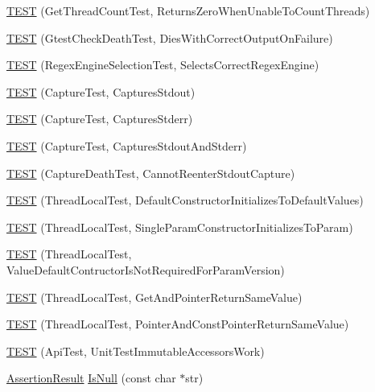 \begin{DoxyCompactItemize}
\item 
\hyperlink{namespacetesting_1_1internal_a5ad8299ae9325382f01b945f4f81711e}{T\+E\+ST} (Get\+Thread\+Count\+Test, Returns\+Zero\+When\+Unable\+To\+Count\+Threads)
\item 
\hyperlink{namespacetesting_1_1internal_afabff70df09a0e4fcda96dd36460c2b9}{T\+E\+ST} (Gtest\+Check\+Death\+Test, Dies\+With\+Correct\+Output\+On\+Failure)
\item 
\hyperlink{namespacetesting_1_1internal_a198f7132f76dd44d48dac54dc5d38fbb}{T\+E\+ST} (Regex\+Engine\+Selection\+Test, Selects\+Correct\+Regex\+Engine)
\item 
\hyperlink{namespacetesting_1_1internal_a0b658d88cea3a2fe6775b1b269c0204b}{T\+E\+ST} (Capture\+Test, Captures\+Stdout)
\item 
\hyperlink{namespacetesting_1_1internal_abbc9510a4f690912c32835213d95198f}{T\+E\+ST} (Capture\+Test, Captures\+Stderr)
\item 
\hyperlink{namespacetesting_1_1internal_a341ff65f3ca44b27fc51f03a9a05bee8}{T\+E\+ST} (Capture\+Test, Captures\+Stdout\+And\+Stderr)
\item 
\hyperlink{namespacetesting_1_1internal_a325a786fb22b87e5aa8d8f584b42ab09}{T\+E\+ST} (Capture\+Death\+Test, Cannot\+Reenter\+Stdout\+Capture)
\item 
\hyperlink{namespacetesting_1_1internal_af366e28e373f36480decc2ea586f48f0}{T\+E\+ST} (Thread\+Local\+Test, Default\+Constructor\+Initializes\+To\+Default\+Values)
\item 
\hyperlink{namespacetesting_1_1internal_a5a52dd578217050e621ebd2aace97a70}{T\+E\+ST} (Thread\+Local\+Test, Single\+Param\+Constructor\+Initializes\+To\+Param)
\item 
\hyperlink{namespacetesting_1_1internal_a6dffc8331590224259b60e855ad07d03}{T\+E\+ST} (Thread\+Local\+Test, Value\+Default\+Contructor\+Is\+Not\+Required\+For\+Param\+Version)
\item 
\hyperlink{namespacetesting_1_1internal_a0e7c2d58a313bec0821df19f44351d84}{T\+E\+ST} (Thread\+Local\+Test, Get\+And\+Pointer\+Return\+Same\+Value)
\item 
\hyperlink{namespacetesting_1_1internal_aaed45d6ba960f02e8d3d042c606bc98e}{T\+E\+ST} (Thread\+Local\+Test, Pointer\+And\+Const\+Pointer\+Return\+Same\+Value)
\item 
\hyperlink{namespacetesting_1_1internal_a9ac879683abb06d1c0bba3a339ea2f40}{T\+E\+ST} (Api\+Test, Unit\+Test\+Immutable\+Accessors\+Work)
\item 
\hyperlink{classtesting_1_1_assertion_result}{Assertion\+Result} \hyperlink{namespacetesting_1_1internal_adcfd37a66bc4cb0e8291cf46e1a6c72b}{Is\+Null} (const char $\ast$str)

\end{DoxyCompactItemize}
